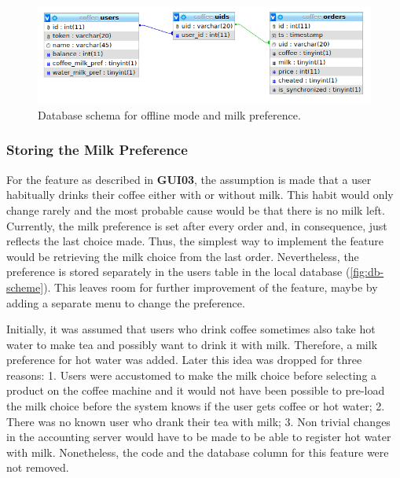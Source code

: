 \documentclass[12pt]{article}
\begin{document}
\begin{figure}[H]
  \centering
  \includegraphics[width=16cm]{./images/database-diagram.png}
  \caption{Database schema for offline mode and milk preference.}
  \label{fig:db-scheme}
\end{figure}

\subsubsection{Storing the Milk Preference}
For the feature as described in \textbf{GUI03}, the assumption is made that a user habitually drinks their coffee either with or without milk.
This habit would only change rarely and the most probable cause would be that there is no milk left.
Currently, the milk preference is set after every order and, in consequence, just reflects the last choice made.
Thus, the simplest way to implement the feature would be retrieving the milk choice from the last order.
Nevertheless, the preference is stored separately in the users table in the local database (\autoref{fig:db-scheme}).
This leaves room for further improvement of the feature, maybe by adding a separate menu to change the preference.

Initially, it was assumed that users who drink coffee sometimes also take hot water to make tea and possibly want to drink it with milk.
Therefore, a milk preference for hot water was added.
Later this idea was dropped for three reasons:
1. Users were accustomed to make the milk choice before selecting a product on the coffee machine 
and it would not have been possible to pre-load the milk choice before the system knows if the user gets coffee or hot water;
2. There was no known user who drank their tea with milk;
3. Non trivial changes in the accounting server would have to be made to be able to register hot water with milk.
Nonetheless, the code and the database column for this feature were not removed.
\end{document}
